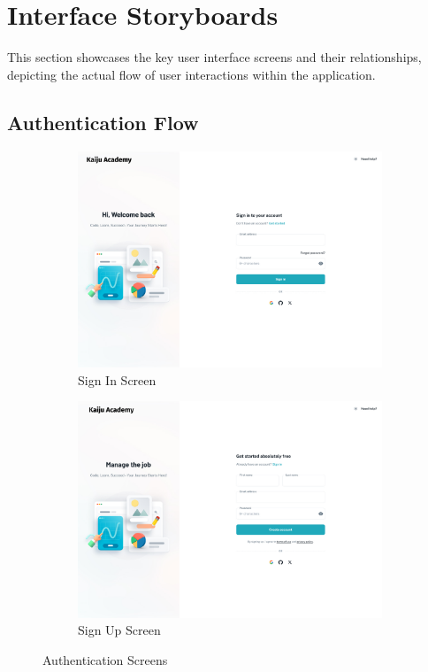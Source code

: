 \documentclass[a4paper, 11pt]{scrreprt}
\begin{document}
\section{Interface Storyboards}
This section showcases the key user interface screens and their relationships, depicting the actual flow of user interactions within the application.

\subsection{Authentication Flow}
\begin{figure}[ht]
    \centering
    \begin{subfigure}[b]{0.45\textwidth}
        \centering
        \includegraphics[width=\textwidth]{UI/SignIn.jpg}
        \caption{Sign In Screen}
    \end{subfigure}
    \hfill
    \begin{subfigure}[b]{0.45\textwidth}
        \centering
        \includegraphics[width=\textwidth]{UI/SignUp.jpg}
        \caption{Sign Up Screen}
    \end{subfigure}
    
    \caption{Authentication Screens}
\end{figure}
\end{document}
